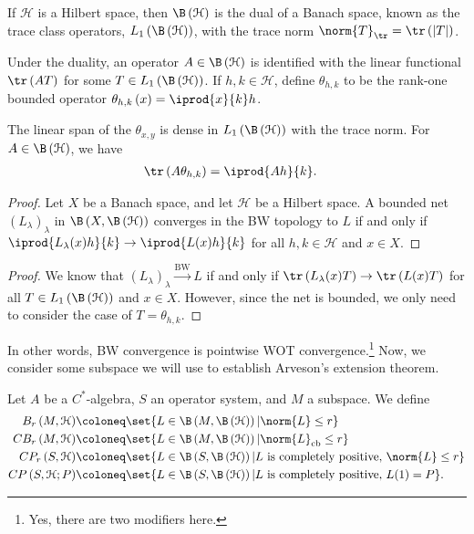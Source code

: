\documentclass[10pt]{mypackage}
\DeclareMathOperator{\cb}{cb}
\begin{document}
If $\mathcal{H}$ is a Hilbert space, then $\B\left( \mathcal{H} \right)$ is the dual of a Banach space, known as the trace class operators, $L_1\left( \B\left( \mathcal{H} \right) \right)$, with the trace norm $\norm{T}_{\tr} = \tr\left( \left\vert T \right\vert \right)$.\newline

Under the duality, an operator $A\in \B\left( \mathcal{H} \right)$ is identified with the linear functional $\tr\left( AT \right)$ for some $T\in L_1\left( \B\left( \mathcal{H} \right) \right)$. If $h,k\in \mathcal{H}$, define $\theta_{h,k}$ to be the rank-one bounded operator $\theta_{h,k}\left( x \right) = \iprod{x}{k}h$.\newline

The linear span of the $\theta_{x,y}$ is dense in $L_1\left( \B\left( \mathcal{H} \right) \right)$ with the trace norm. For $A\in \B\left( \mathcal{H} \right)$, we have
\begin{align*}
  \tr\left( A\theta_{h,k} \right) &= \iprod{Ah}{k}.
\end{align*}
\begin{proof}
  Let $X$ be a Banach space, and let $\mathcal{H}$ be a Hilbert space. A bounded net $\left( L_{\lambda} \right)_{\lambda}$ in $\B\left( X,\B\left( \mathcal{H} \right) \right)$ converges in the BW topology to $L$ if and only if $ \iprod{L_{\lambda}(x)h}{k} \rightarrow \iprod{L(x)h}{k} $ for all $h,k\in \mathcal{H}$ and $x\in X$.
\end{proof}
\begin{proof}
  We know that $\left( L_{\lambda} \right)_{\lambda}\xrightarrow{\text{BW}} L$ if and only if $\tr\left( L_{\lambda}(x)T \right)\rightarrow \tr\left( L(x)T \right)$ for all $T\in L_1\left( \B\left( \mathcal{H} \right) \right)$ and $x\in X$. However, since the net is bounded, we only need to consider the case of $T = \theta_{h,k}$.
\end{proof}
In other words, BW convergence is pointwise WOT convergence.\footnote{Yes, there are two modifiers here.} Now, we consider some subspace we will use to establish Arveson's extension theorem.
\begin{definition}
  Let $A$ be a $C^{\ast}$-algebra, $S$ an operator system, and $M$ a subspace. We define
  \begin{align*}
    B_r\left( M,\mathcal{H} \right) &\coloneq \set{L\in \B\left( M,\B\left( \mathcal{H} \right) \right) | \norm{L} \leq r}\\
    CB_{r}\left( M,\mathcal{H} \right) &\coloneq \set{L\in \B\left( M,\B\left( \mathcal{H} \right) \right) | \norm{L}_{\cb}\leq r}\\
    CP_{r}\left( S,\mathcal{H} \right) &\coloneq \set{L\in \B\left( S,\B\left( \mathcal{H} \right) \right) | L\text{ is completely positive, }\norm{L}\leq r}\\
    CP\left( S,\mathcal{H};P \right) &\coloneq \set{L\in \B\left( S,\B\left( \mathcal{H} \right) \right) | L\text{ is completely positive, }L(1) = P}.
  \end{align*}
\end{definition}
\end{document}
